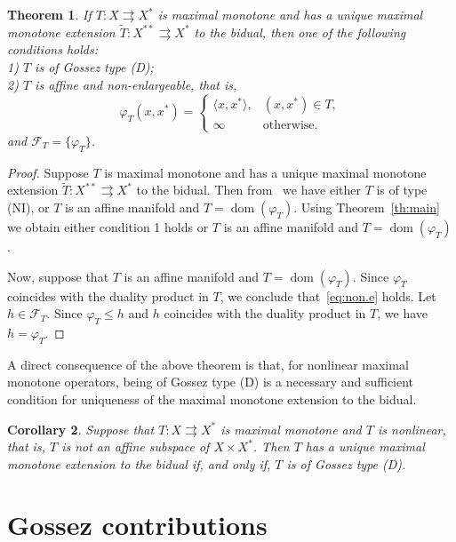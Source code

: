 \documentclass[11pt]{article}
\newcommand{\F}{\mathcal{F}}
\DeclareMathOperator{\ed}{dom}
\newcommand{\inner}[2]{\langle{#1},{#2}\rangle}
\newcommand{\tos}{\rightrightarrows} %
\newtheorem{theorem}{Theorem}[section]
\newtheorem{corollary}[theorem]{Corollary}
\begin{document}
\begin{theorem}\label{th:s}
  If $T:X\tos X^*$ is maximal monotone and has a unique maximal
  monotone extension $\tilde T:X^{**}\tos X^*$ to the bidual, then
  one of the following conditions  holds:\\
  1) $T$ is of Gossez type (D);\\
  2) $T$ is affine and non-enlargeable, that is,
  \begin{equation}
    \label{eq:non.e}
     \varphi_T(x,x^*)=
  \begin{cases}
    \inner{x}{x^*},& (x,x^*)\in T,\\
    \infty&   \mbox{otherwise}.
  \end{cases}
  \end{equation}
 and $\F_T=\{\varphi_T\}$.
\end{theorem}

\begin{proof}
  Suppose $T$ is maximal monotone and has a unique maximal monotone
  extension $\tilde T:X^{**}\tos X^*$ to the bidual.
  Then from~\cite[Theorem 1.3]{alv.sva-max.jca09} we have either $T$
  is of type (NI), or $T$ is an affine manifold and
  $T=\ed(\varphi_T)$.
  Using Theorem~\ref{th:main} we
  obtain either condition 1 holds or  $T$ is an affine manifold and
  $T=\ed(\varphi_T)$.


  Now, suppose that $T$ is an affine manifold and
  $T=\ed(\varphi_T)$. Since $\varphi_T$ coincides with the duality
  product in $T$, we conclude that~\eqref{eq:non.e} holds. Let
  $h\in\F_T$. Since $\varphi_T\leq h$ and $h$ coincides with the duality
  product in $T$, we have $h=\varphi_T$.
\end{proof}


A direct consequence of the above theorem is that, for nonlinear
maximal monotone operators, being of Gossez type (D) is a necessary and
sufficient condition for uniqueness of the maximal monotone extension to
the bidual.
\begin{corollary}
  Suppose that $T:X\tos X^*$ is maximal monotone and $T$ is nonlinear,
  that is, $T$ is not an affine subspace of $X\times X^*$. Then $T$
  has a unique maximal monotone extension to the bidual if, and only
  if, $T$ is of Gossez type (D).
\end{corollary}
\section{Gossez contributions}
\end{document}
